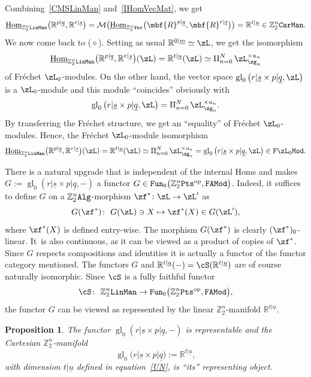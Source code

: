\documentclass[pdftex]{sigma}%
\newcommand{\op}[1]{\operatorname{#1}}
\newcommand{\R}{{\mathbb R}}
\newcommand{\Z}{{\mathbb Z}}
\def\ul{\underline}
\def\cM{\cal M}
\def\cM{\mathcal{M}}
\def\ul{\underline}
\newcommand{\0}{\otimes}
\newcommand{\z}{\Z_2^n}
\numberwithin{equation}{section}
\newtheorem{Proposition}[Theorem]{Proposition}
 { \theoremstyle{definition}
\newtheorem{Definition}[Theorem]{Definition}
\newtheorem{Example}[Theorem]{Example}
\newtheorem{Remark}[Theorem]{Remark} }
\begin{document}
Combining~\eqref{CMSLinMan} and~\eqref{IHomVecMat}, we get
\begin{gather}\label{IntHomLinManCarMan}
\ul{\op{Hom}}_{\z\tt LinMan}\big(\R^{p|\ul q},\R^{r|\ul s}\big)=\cM\big(\ul{\op{Hom}}_{\z\tt Vec}\big(\mbf{R}^{p|\ul q},\mbf{R}^{r|\ul s}\big)\big)=\R^{t|\ul u}\in\z{\tt CarMan}.
\end{gather}
We now come back to ($\diamond$). Setting as usual $\R^{0|\ul m}\simeq\zL$, we get the isomorphism
\[
\ul{\op{Hom}}_{\z\tt LinMan}\big(\R^{p|\ul q},\R^{r|\ul s}\big)(\zL)=\R^{t|\ul u}(\zL)\simeq \Pi_{n=0}^N\,\zL_{\zg_n}^{\times u_n}
\]
of Fr\'echet $\zL_0$-modules. On the other hand, the vector space $\op{gl}_0\big(r|\ul s\times p|\ul q,\zL\big)$ is a $\zL_0$-module and this module ``coincides'' obviously with
\[
\op{gl}_0\big(r|\ul s\times p|\ul q,\zL\big)=\Pi_{n=0}^N\,\zL_{\zg_n}^{\times u_n}.
\]
By transferring the Fr\'echet structure, we get an ``equality'' of Fr\'echet $\zL_0$-modules. Hence, the Fr\'echet $\zL_0$-module isomorphism
\begin{gather}\label{Man0Mat}
\ul{\op{Hom}}_{\z\tt LinMan}\big(\R^{p|\ul q},\R^{r|\ul s}\big)(\zL)=\R^{t|\ul u}(\zL)\simeq \Pi_{n=0}^N\,\zL_{\zg_n}^{\times u_n}=\op{gl}_0\big(r|\ul s\times p|\ul q,\zL\big)\in{\tt F}\zL_0{\tt Mod}.
\end{gather}

There is a natural upgrade that is independent of the internal Homs and makes $G:=\op{gl}_0(r|\ul s\times p|\ul q,-)$ a functor $G\in{\tt Fun_0}\big(\z{\tt Pts}^{\op{op}},{\tt FAMod}\big)$. Indeed, it suffices to define $G$ on a $\z{\tt Alg}$-morphism $\zf^*\colon \zL\to\zL'$ as
\[
G(\zf^*)\colon\ G(\zL)\ni X\mapsto \zf^*(X)\in G(\zL'),
\]
where $\zf^*(X)$ is defined entry-wise. The morphism $G(\zf^*)$ is clearly $(\zf^*)_0$-linear. It~is also continuous, as it can be viewed as a product of copies of $\zf^*$. Since $G$ respects compositions and identities it is actually a functor of the functor category mentioned. The functors $G$ and $\R^{t|\ul u}(-)=\cS(\R^{t|\ul u})$ are of course naturally isomorphic. Since $\cS$ is a fully faithful functor
\[
\cS\colon\ \z{\tt LinMan}\to{\tt Fun_0}\big(\z{\tt Pts}^{\op{op}},{\tt FAMod}\big),
\]
the functor $G$ can be viewed as represented by the linear $\z$-manifold $\R^{t|\ul u}$.
\begin{Proposition}\label{gl0}
The functor $\op{gl}_0(r|\ul s\times p|\ul q,-)$ is representable and the Cartesian $\z$-manifold
\[
\op{gl}_0\big(r|\ul s\times p|\ul q\big):=\R^{t|\ul u},
\]
with dimension $t|\ul u$ defined in equation~\eqref{UN}, is ``its'' representing object.
\end{Proposition}
\end{document}
